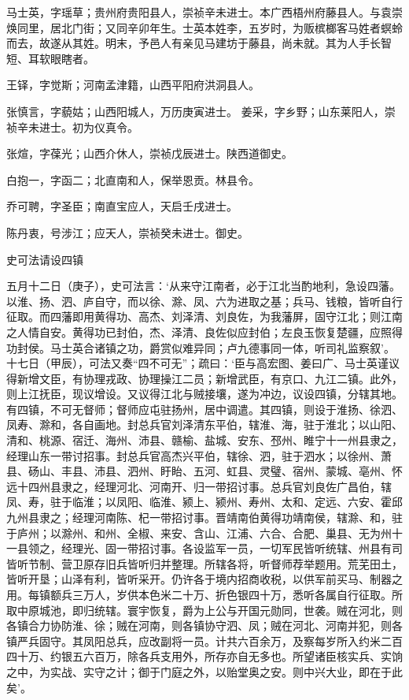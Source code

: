 \documentclass[]{article}
\begin{document}
马士英，字瑶草；贵州府贵阳县人，崇祯辛未进士。本广西梧州府藤县人。与袁崇焕同里，居北门街；又同辛卯年生。士英本姓李，五岁时，为贩槟榔客马姓者螟蛉而去，故遂从其姓。明末，予邑人有亲见马建坊于藤县，尚未就。其为人手长智短、耳软眼瞎者。

王铎，字觉斯；河南孟津籍，山西平阳府洪洞县人。

张慎言，字藐姑；山西阳城人，万历庚寅进士。
姜采，字乡野；山东莱阳人，崇祯辛未进士。初为仪真令。

张煊，字葆光；山西介休人，崇祯戊辰进士。陕西道御史。

白抱一，字函二；北直南和人，保举恩贡。林县令。

乔可聘，字圣臣；南直宝应人，天启壬戌进士。

陈丹衷，号涉江；应天人，崇祯癸未进士。御史。

史可法请设四镇

五月十二日（庚子），史可法言：`从来守江南者，必于江北当酌地利，急设四藩。以淮、扬、泗、庐自守，而以徐、滁、凤、六为进取之基；兵马、钱粮，皆听自行征取。而四藩即用黄得功、高杰、刘泽清、刘良佐，为我藩屏，固守江北；则江南之人情自安。黄得功已封伯，杰、泽清、良佐似应封伯；左良玉恢复楚疆，应照得功封侯。马士英合诸镇之功，爵赏似难异同；卢九德事同一体，听司礼监察叙'。十七日（甲辰），可法又奏``四不可无''；疏曰：`臣与高宏图、姜曰广、马士英谨议得新增文臣，有协理戎政、协理操江二员；新增武臣，有京口、九江二镇。此外，则上江抚臣，现议增设。又议得江北与贼接壤，遂为冲边，议设四镇，分辖其地。有四镇，不可无督师；督师应屯驻扬州，居中调遣。其四镇，则设于淮扬、徐泗、凤寿、滁和，各自画地。封总兵官刘泽清东平伯，辖淮、海，驻于淮北；以山阳、清和、桃源、宿迁、海州、沛县、赣榆、盐城、安东、邳州、睢宁十一州县隶之，经理山东一带讨招事。封总兵官高杰兴平伯，辖徐、泗，驻于泗水；以徐州、萧县、砀山、丰县、沛县、泗州、盱眙、五河、虹县、灵璧、宿州、蒙城、亳州、怀远十四州县隶之，经理河北、河南开、归一带招讨事。总兵官刘良佐广昌伯，辖凤、寿，驻于临淮；以凤阳、临淮、颍上、颍州、寿州、太和、定远、六安、霍邱九州县隶之；经理河南陈、杞一带招讨事。晋靖南伯黄得功靖南侯，辖滁、和，驻于庐州；以滁州、和州、全椒、来安、含山、江浦、六合、合肥、巢县、无为州十一县领之，经理光、固一带招讨事。各设监军一员，一切军民皆听统辖、州县有司皆听节制、营卫原存旧兵皆听归并整理。所辖各将，听督师荐举题用。荒芜田土，皆听开垦；山泽有利，皆听采开。仍许各于境内招商收税，以供军前买马、制器之用。每镇额兵三万人，岁供本色米二十万、折色银四十万，悉听各属自行征取。所取中原城池，即归统辖。寰宇恢复，爵为上公与开国元勋同，世袭。贼在河北，则各镇合力协防淮、徐；贼在河南，则各镇协守泗、凤；贼在河北、河南并犯，则各镇严兵固守。其凤阳总兵，应改副将一员。计共六百余万，及察每岁所入约米二百四十万、约银五六百万，除各兵支用外，所存亦自无多也。所望诸臣核实兵、实饷之中，为实战、实守之计；御于门庭之外，以贻堂奥之安。则中兴大业，即在于此矣'。
\end{document}
